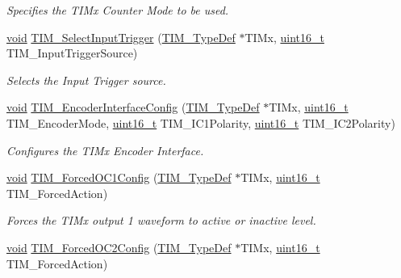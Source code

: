 \begin{DoxyCompactItemize}
\begin{DoxyCompactList}\small\item\em Specifies the T\+I\+Mx Counter Mode to be used. \end{DoxyCompactList}\item 
\hyperlink{usb__devapi_8h_afabf60e7f57651d6d595a02c75f07cd0}{void} \hyperlink{group___t_i_m___private___functions_ga4252583c6ae8a73d6fc66f7e951dbc35}{T\+I\+M\+\_\+\+Select\+Input\+Trigger} (\hyperlink{struct_t_i_m___type_def}{T\+I\+M\+\_\+\+Type\+Def} $\ast$T\+I\+Mx, \hyperlink{_p_e___types_8h_a1f1825b69244eb3ad2c7165ddc99c956}{uint16\+\_\+t} T\+I\+M\+\_\+\+Input\+Trigger\+Source)
\begin{DoxyCompactList}\small\item\em Selects the Input Trigger source. \end{DoxyCompactList}\item 
\hyperlink{usb__devapi_8h_afabf60e7f57651d6d595a02c75f07cd0}{void} \hyperlink{group___t_i_m___private___functions_ga0fc7e76c47a3bd1ba1ebc71427832b51}{T\+I\+M\+\_\+\+Encoder\+Interface\+Config} (\hyperlink{struct_t_i_m___type_def}{T\+I\+M\+\_\+\+Type\+Def} $\ast$T\+I\+Mx, \hyperlink{_p_e___types_8h_a1f1825b69244eb3ad2c7165ddc99c956}{uint16\+\_\+t} T\+I\+M\+\_\+\+Encoder\+Mode, \hyperlink{_p_e___types_8h_a1f1825b69244eb3ad2c7165ddc99c956}{uint16\+\_\+t} T\+I\+M\+\_\+\+I\+C1\+Polarity, \hyperlink{_p_e___types_8h_a1f1825b69244eb3ad2c7165ddc99c956}{uint16\+\_\+t} T\+I\+M\+\_\+\+I\+C2\+Polarity)
\begin{DoxyCompactList}\small\item\em Configures the T\+I\+Mx Encoder Interface. \end{DoxyCompactList}\item 
\hyperlink{usb__devapi_8h_afabf60e7f57651d6d595a02c75f07cd0}{void} \hyperlink{group___t_i_m___private___functions_ga4f58c12e6493a0d8b9555c9097b831d6}{T\+I\+M\+\_\+\+Forced\+O\+C1\+Config} (\hyperlink{struct_t_i_m___type_def}{T\+I\+M\+\_\+\+Type\+Def} $\ast$T\+I\+Mx, \hyperlink{_p_e___types_8h_a1f1825b69244eb3ad2c7165ddc99c956}{uint16\+\_\+t} T\+I\+M\+\_\+\+Forced\+Action)
\begin{DoxyCompactList}\small\item\em Forces the T\+I\+Mx output 1 waveform to active or inactive level. \end{DoxyCompactList}\item 
\hyperlink{usb__devapi_8h_afabf60e7f57651d6d595a02c75f07cd0}{void} \hyperlink{group___t_i_m___private___functions_ga3d2902b6fbab8dd55cd531055ffcc63d}{T\+I\+M\+\_\+\+Forced\+O\+C2\+Config} (\hyperlink{struct_t_i_m___type_def}{T\+I\+M\+\_\+\+Type\+Def} $\ast$T\+I\+Mx, \hyperlink{_p_e___types_8h_a1f1825b69244eb3ad2c7165ddc99c956}{uint16\+\_\+t} T\+I\+M\+\_\+\+Forced\+Action)

\end{DoxyCompactItemize}
